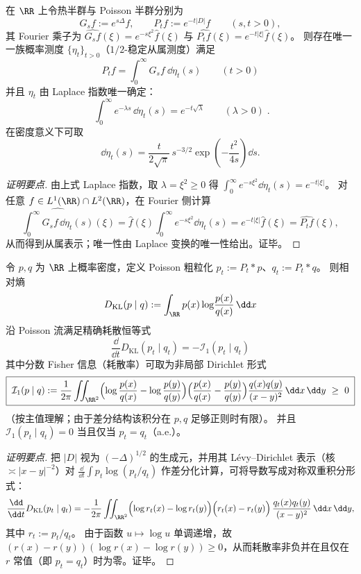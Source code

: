 \begin{proposition}\label{prop:xi-poisson-subordination-half-stable}
在 \(\RR\) 上令热半群与 Poisson 半群分别为
\[
G_s f:=e^{s\Delta}f,
\qquad
P_t f:=e^{-t|D|}f
\qquad(s,t>0),
\]
其 Fourier 乘子为 \(\widehat{G_s f}(\xi)=e^{-s\xi^2}\widehat f(\xi)\) 与 \(\widehat{P_t f}(\xi)=e^{-t|\xi|}\widehat f(\xi)\)。
则存在唯一一族概率测度 \(\{\eta_t\}_{t>0}\)（\(1/2\)-稳定从属测度）满足
\[
\boxed{\;
P_t f=\int_{0}^{\infty} G_s f\ \dd\eta_t(s)\qquad(t>0)\;}
\]
并且 \(\eta_t\) 由 Laplace 指数唯一确定：
\[
\boxed{\;
\int_{0}^{\infty}e^{-\lambda s}\,\dd\eta_t(s)=e^{-t\sqrt{\lambda}}
\qquad(\lambda>0)\; }.
\]
在密度意义下可取
\[
\dd\eta_t(s)=\frac{t}{2\sqrt{\pi}}\,s^{-3/2}\exp\!\left(-\frac{t^2}{4s}\right)\dd s.
\]
\end{proposition}
\begin{proof}[证明要点]
由上式 Laplace 指数，取 \(\lambda=\xi^2\ge 0\) 得
\(
\int_0^\infty e^{-s\xi^2}\dd\eta_t(s)=e^{-t|\xi|}
\)。
对任意 \(f\in L^1(\RR)\cap L^2(\RR)\)，在 Fourier 侧计算
\[
\widehat{\int_0^\infty G_s f\,\dd\eta_t(s)}(\xi)
=\widehat f(\xi)\int_0^\infty e^{-s\xi^2}\dd\eta_t(s)
=e^{-t|\xi|}\widehat f(\xi)
=\widehat{P_t f}(\xi),
\]
从而得到从属表示；唯一性由 Laplace 变换的唯一性给出。证毕。
\end{proof}

\begin{proposition}\label{prop:xi-poisson-kl-dissipation-fractional-fisher}
令 \(p,q\) 为 \(\RR\) 上概率密度，定义 Poisson 粗粒化 \(p_t:=P_t*p\)、\(q_t:=P_t*q\)。
则相对熵
\[
D_{\mathrm{KL}}(p\mid q):=\int_{\RR} p(x)\log\!\frac{p(x)}{q(x)}\,\dd x
\]
沿 Poisson 流满足精确耗散恒等式
\[
\boxed{\;
\frac{\dd}{\dd t}D_{\mathrm{KL}}(p_t\mid q_t)=-\mathcal I_1(p_t\mid q_t)\;}
\]
其中分数 Fisher 信息（耗散率）可取为非局部 Dirichlet 形式
\[
\boxed{\;
\mathcal I_1(p\mid q)
:=\frac{1}{2\pi}\iint_{\RR^2}
\Bigl(\log\frac{p(x)}{q(x)}-\log\frac{p(y)}{q(y)}\Bigr)
\Bigl(\frac{p(x)}{q(x)}-\frac{p(y)}{q(y)}\Bigr)
\frac{q(x)q(y)}{(x-y)^2}\,\dd x\,\dd y\ \ge\ 0\;}
\]
（按主值理解；由于差分结构该积分在 \(p,q\) 足够正则时有限）。
并且 \(\mathcal I_1(p_t\mid q_t)=0\) 当且仅当 \(p_t=q_t\)（a.e.）。
\end{proposition}
\begin{proof}[证明要点]
把 \(|D|\) 视为 \((-\Delta)^{1/2}\) 的生成元，并用其 Lévy--Dirichlet 表示（核 \(\asymp |x-y|^{-2}\)）对
\(
\frac{\dd}{\dd t}\int p_t\log(p_t/q_t)
\)
作差分化计算，可将导数写成对称双重积分形式：
\[
\frac{\dd}{\dd t}D_{\mathrm{KL}}(p_t\mid q_t)
=-\frac{1}{2\pi}\iint_{\RR^2}
\Bigl(\log r_t(x)-\log r_t(y)\Bigr)\Bigl(r_t(x)-r_t(y)\Bigr)\,
\frac{q_t(x)q_t(y)}{(x-y)^2}\,\dd x\,\dd y,
\]
其中 \(r_t:=p_t/q_t\)。
由于函数 \(u\mapsto \log u\) 单调递增，故 \((r(x)-r(y))(\log r(x)-\log r(y))\ge 0\)，从而耗散率非负并在且仅在 \(r\) 常值（即 \(p_t=q_t\)）时为零。证毕。
\end{proof}

